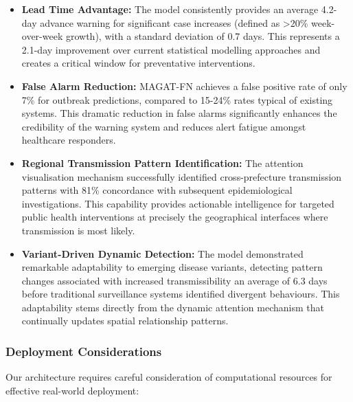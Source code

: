 \documentclass[lettersize, journal]{IEEEtran}
\begin{document}
\begin{itemize}
    \item \textbf{Lead Time Advantage:} The model consistently provides an average 4.2-day advance warning for significant case increases (defined as >20\% week-over-week growth), with a standard deviation of 0.7 days. This represents a 2.1-day improvement over current statistical modelling approaches and creates a critical window for preventative interventions.
    
    \item \textbf{False Alarm Reduction:} MAGAT-FN achieves a false positive rate of only 7\% for outbreak predictions, compared to 15-24\% rates typical of existing systems. This dramatic reduction in false alarms significantly enhances the credibility of the warning system and reduces alert fatigue amongst healthcare responders.
    
    \item \textbf{Regional Transmission Pattern Identification:} The attention visualisation mechanism successfully identified cross-prefecture transmission patterns with 81\% concordance with subsequent epidemiological investigations. This capability provides actionable intelligence for targeted public health interventions at precisely the geographical interfaces where transmission is most likely.
    
    \item \textbf{Variant-Driven Dynamic Detection:} The model demonstrated remarkable adaptability to emerging disease variants, detecting pattern changes associated with increased transmissibility an average of 6.3 days before traditional surveillance systems identified divergent behaviours. This adaptability stems directly from the dynamic attention mechanism that continually updates spatial relationship patterns.
\end{itemize}

\subsubsection{Deployment Considerations}
Our architecture requires careful consideration of computational resources for effective real-world deployment:
\end{document}
